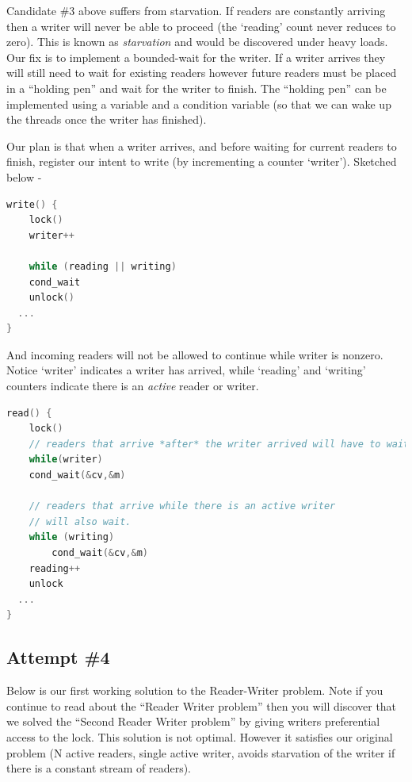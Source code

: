 Candidate \#3 above suffers from starvation. If readers are constantly arriving then a writer will never be able to proceed (the `reading' count never reduces to zero). This is known as \emph{starvation} and would be discovered under heavy loads. Our fix is to implement a bounded-wait for the writer. If a writer arrives they will still need to wait for existing readers however future readers must be placed in a ``holding pen'' and wait for the writer to finish. The ``holding pen'' can be implemented using a variable and a condition variable (so that we can wake up the threads once the writer has finished).

Our plan is that when a writer arrives, and before waiting for current readers to finish, register our intent to write (by incrementing a counter `writer'). Sketched below -

\begin{lstlisting}[language=C]
write() {
    lock()
    writer++

    while (reading || writing)
    cond_wait
    unlock()
  ...
}
\end{lstlisting}

And incoming readers will not be allowed to continue while writer is nonzero. Notice `writer' indicates a writer has arrived, while `reading' and `writing' counters indicate there is an \emph{active} reader or writer.

\begin{lstlisting}[language=C]
read() {
    lock()
    // readers that arrive *after* the writer arrived will have to wait here!
    while(writer)
    cond_wait(&cv,&m)

    // readers that arrive while there is an active writer
    // will also wait.
    while (writing) 
        cond_wait(&cv,&m)
    reading++
    unlock
  ...
}
\end{lstlisting}

\subsection{Attempt \#4}\label{attempt-4}

Below is our first working solution to the Reader-Writer problem. Note if you continue to read about the ``Reader Writer problem'' then you will discover that we solved the ``Second Reader Writer problem'' by giving writers preferential access to the lock. This solution is not optimal. However it satisfies our original problem (N active readers, single active writer, avoids starvation of the writer if there is a constant stream of readers).

